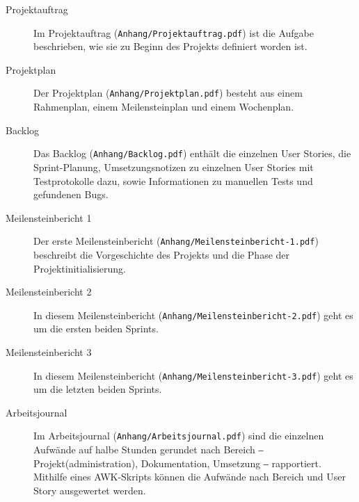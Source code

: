 \begin{description}
    \item[Projektauftrag] Im Projektauftrag (\texttt{Anhang/Projektauftrag.pdf}) ist die Aufgabe beschrieben, wie sie zu Beginn des Projekts definiert worden ist.
    \item[Projektplan] Der Projektplan (\texttt{Anhang/Projektplan.pdf}) besteht aus einem Rahmenplan, einem Meilensteinplan und einem Wochenplan.
    \item[Backlog] Das Backlog (\texttt{Anhang/Backlog.pdf}) enthält die einzelnen User Stories, die Sprint-Planung, Umsetzungsnotizen zu einzelnen User Stories mit Testprotokolle dazu, sowie Informationen zu manuellen Tests und gefundenen Bugs.
    \item[Meilensteinbericht 1] Der erste Meilensteinbericht (\texttt{Anhang/Meilensteinbericht-1.pdf}) beschreibt die Vorgeschichte des Projekts und die Phase der Projektinitialisierung.
    \item[Meilensteinbericht 2] In diesem Meilensteinbericht (\texttt{Anhang/Meilensteinbericht-2.pdf}) geht es um die ersten beiden Sprints.
    \item[Meilensteinbericht 3] In diesem Meilensteinbericht (\texttt{Anhang/Meilensteinbericht-3.pdf}) geht es um die letzten beiden Sprints.
    \item[Arbeitsjournal] Im Arbeitsjournal (\texttt{Anhang/Arbeitsjournal.pdf}) sind die einzelnen Aufwände auf halbe Stunden gerundet nach Bereich ‒ Projekt(administration), Dokumentation, Umsetzung ‒ rapportiert. Mithilfe eines AWK-Skripts können die Aufwände nach Bereich und User Story ausgewertet werden.
\end{description}

